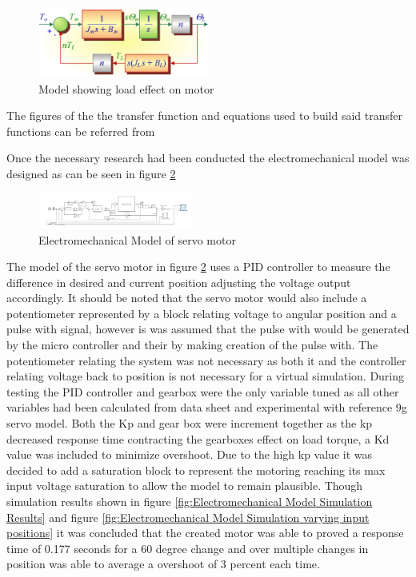 \begin{figure}[h]
 \centering
   \includegraphics[width = 0.5\textwidth]{figures/6.png}                \caption{Model showing load effect on motor}
   \label{fig:Model Showing Load Effect on motor}
\end{figure}
 The figures of the the transfer function and equations used to build said transfer functions can be referred from   \cite{article}
 




Once the necessary research had been conducted the electromechanical model was designed as can be seen in figure \ref{fig:Electromechanical Model}


\begin{figure}[H]
 \centering
   \includegraphics[width = 0.45\textwidth]{figures/14.png}  \caption{Electromechanical Model of servo motor}
   \label{fig:Electromechanical Model}
\end{figure}

The model of the servo motor in figure \ref{fig:Electromechanical Model} uses a PID controller to measure the difference in desired and current position adjusting the voltage output accordingly. It should be noted that the servo motor would also include a potentiometer represented by a block relating voltage to angular position and a pulse with signal, however is was assumed that the pulse with would be generated by the micro controller and their by making creation of the pulse with. The potentiometer relating the system was not necessary as both it and the controller relating voltage back to position is not necessary for a virtual simulation. During testing the PID controller and gearbox were the only variable tuned as all other variables had been calculated from data sheet and experimental with reference 9g servo model. Both the Kp and gear box were increment together as the kp decreased response time contracting the gearboxes effect on load torque, a Kd value was included to minimize overshoot. Due to the high kp value it was decided to add a saturation block to represent the motoring reaching its max input voltage saturation to allow the model to remain plausible. Though simulation results shown in figure \ref{fig:Electromechanical Model Simulation Results} and figure \ref{fig:Electromechanical Model Simulation varying input positions}  it was concluded that the created motor was able to proved a response time of 0.177 seconds for a 60 degree change and over multiple changes in position was able to average a overshoot of 3 percent each time.

